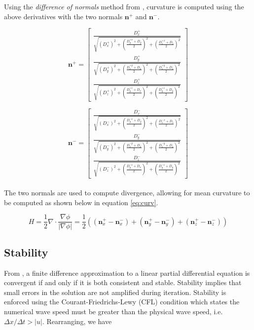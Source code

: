 Using the \textit{difference of normals} method from \cite{Lefohn04astreaming}, curvature is computed using the above derivatives with the two normals $\textbf{n}^+$ and $\textbf{n}^-$.


\begin{equation}
\textbf{n}^+ = \left[
  \begin{array}{ c }
     \frac{D_x^+}{\sqrt{(D_x^+)^2 + {\left(\frac{D_y^{+x}+D_y}{2}\right)}^2 +{\left(\frac{D_z^{+x}+D_z}{2}\right)}^2  }}  \\[2em]
     \frac{D_y^+}{\sqrt{(D_y^+)^2 + {\left(\frac{D_x^{+y}+D_x}{2}\right)}^2 +{\left(\frac{D_z^{+y}+D_z}{2}\right)}^2  }}  \\[2em]
     \frac{D_z^+}{\sqrt{(D_z^+)^2 + {\left(\frac{D_y^{+z}+D_x}{2}\right)}^2 +{\left(\frac{D_y^{+z}+D_y}{2}\right)}^2  }}  
  \end{array} \right] 
\label{eq:nplus}
\end{equation}

\begin{equation}
\textbf{n}^- = \left[
  \begin{array}{ c }
     \frac{D_x^-}{\sqrt{(D_x^-)^2 + {\left(\frac{D_y^{-x}+D_y}{2}\right)}^2 +{\left(\frac{D_z^{-x}+D_z}{2}\right)}^2  }}  \\[2em]
     \frac{D_y^-}{\sqrt{(D_y^-)^2 + {\left(\frac{D_x^{-y}+D_x}{2}\right)}^2 +{\left(\frac{D_z^{-y}+D_z}{2}\right)}^2  }}  \\[2em]
     \frac{D_z^-}{\sqrt{(D_z^-)^2 + {\left(\frac{D_y^{-z}+D_x}{2}\right)}^2 +{\left(\frac{D_y^{-z}+D_y}{2}\right)}^2  }}  
  \end{array} \right]
\label{eq:nminus}
\end{equation}
\\
The two normals are used to compute divergence, allowing for mean curvature to be computed as shown below in equation \eqref{eq:curv}.

\begin{equation}
H = \frac{1}{2}\nabla\cdot\frac{\nabla\phi}{|\nabla\phi|} = \frac{1}{2}((\textbf{n}_x^+ - \textbf{n}_x^-)+(\textbf{n}_y^+ - \textbf{n}_y^-)+(\textbf{n}_z^+ - \textbf{n}_z^-))
\label{eq:curv}
\end{equation}


\subsection{Stability}\label{stability}
From \cite{osher2003lsm}, a finite difference approximation to a linear partial differential equation is convergent if and only if it is both consistent and stable. Stability implies that small errors in the solution are not amplified during iteration. Stability is enforced using the Courant-Friedrichs-Lewy (CFL) condition which states the numerical wave speed must be greater than the physical wave speed, i.e. $\Delta x/\Delta t>|u|$. Rearranging, we have

